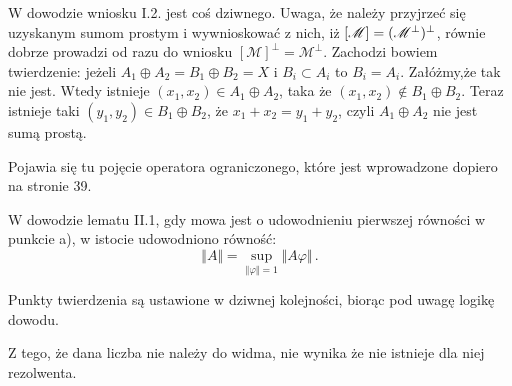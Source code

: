 \documentclass[a4paper,11pt]{article}
\begin{document}
\vspace{\spaceFour}




\noindent
{} W dowodzie wniosku I.2. jest coś dziwnego. Uwaga, że
należy przyjrzeć się uzyskanym sumom prostym i wywnioskować z nich,
iż $[ \mathcal{M} ]=( \mathcal{M}^{ \bot } )^{ \bot }$, równie
dobrze prowadzi od razu do wniosku
$[ \mathcal{ M } ]^{ \bot } = \mathcal{ M }^{ \bot }$. Zachodzi
bowiem twierdzenie: jeżeli
$A_{ 1 } \oplus A_{ 2 } = B_{ 1 } \oplus B_{ 2 } = X$ i
$B_{ i } \subset A_{ i }$ to $B_{ i } = A_{ i }$. Załóżmy,że tak nie
jest. Wtedy istnieje
$( x_{ 1 }, x_{ 2 } ) \in A_{ 1 } \oplus A_{ 2 }$, taka że
$( x_{ 1 }, x_{ 2 } ) \notin B_{ 1 } \oplus B_{ 2 }$. Teraz istnieje
taki $( y_{ 1 }, y_{ 2 } ) \in B_{ 1 } \oplus B_{ 2 }$, że
$x_{ 1 } + x_{ 2 } = y_{ 1 } + y_{ 2 }$, czyli
$A_{ 1 } \oplus A_{ 2 }$ nie jest sumą prostą.

\vspace{\spaceFour}





\noindent
{} Pojawia się tu pojęcie operatora ograniczonego, które
jest wprowadzone dopiero na stronie 39.

\vspace{\spaceFour}





\noindent
{} W dowodzie lematu II.1, gdy mowa jest o udowodnieniu
pierwszej równości w punkcie a), w istocie udowodniono równość:
\begin{equation}
  \label{eq:GrabowskiIngarden-01}
  \Vert A \Vert = \sup_{ \Vert \varphi \Vert = 1 } \Vert A \varphi \Vert \, .
\end{equation}

\vspace{\spaceFour}





\noindent
{} Punkty twierdzenia są ustawione w dziwnej kolejności,
biorąc pod uwagę logikę dowodu.

\vspace{\spaceFour}





\noindent
{} Z tego, że dana liczba nie należy do widma, nie wynika
że nie istnieje dla niej rezolwenta.

\vspace{\spaceFour}
\end{document}

